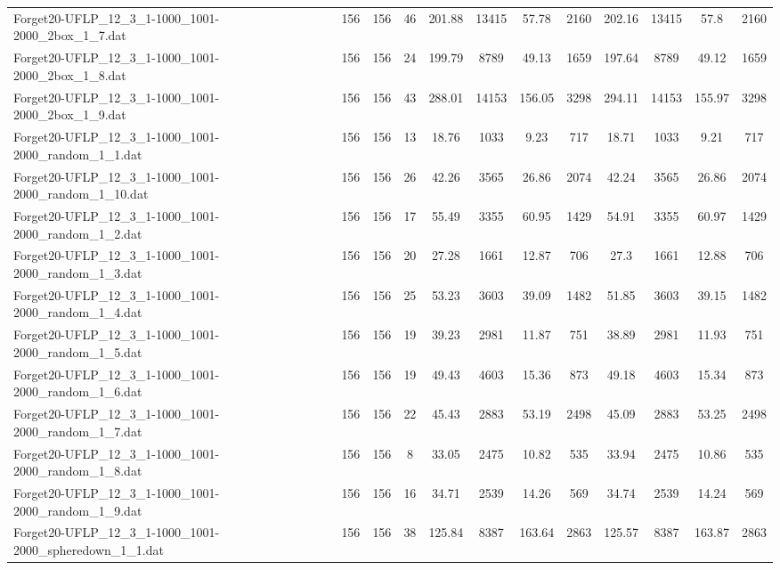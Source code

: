 \begin{sidewaystable}[!ht]
{\begin{tabular}{lccccccccccc}
Forget20-UFLP\_12\_3\_1-1000\_1001-2000\_2box\_1\_7.dat & 156 & 156 & 46 & 201.88 & 13415 &  \textcolor{blue2}{57.78} & 2160 & 202.16 & 13415 & 57.8 & 2160 \\
Forget20-UFLP\_12\_3\_1-1000\_1001-2000\_2box\_1\_8.dat & 156 & 156 & 24 & 199.79 & 8789 & 49.13 & 1659 & 197.64 & 8789 &  \textcolor{blue2}{49.12} & 1659 \\
Forget20-UFLP\_12\_3\_1-1000\_1001-2000\_2box\_1\_9.dat & 156 & 156 & 43 & 288.01 & 14153 & 156.05 & 3298 & 294.11 & 14153 & 155.97 & 3298 \\
Forget20-UFLP\_12\_3\_1-1000\_1001-2000\_random\_1\_1.dat & 156 & 156 & 13 & 18.76 & 1033 & 9.23 & 717 & 18.71 & 1033 & 9.21 & 717 \\
Forget20-UFLP\_12\_3\_1-1000\_1001-2000\_random\_1\_10.dat & 156 & 156 & 26 & 42.26 & 3565 & 26.86 & 2074 & 42.24 & 3565 & 26.86 & 2074 \\
Forget20-UFLP\_12\_3\_1-1000\_1001-2000\_random\_1\_2.dat & 156 & 156 & 17 & 55.49 & 3355 & 60.95 & 1429 &  \textcolor{blue2}{54.91} & 3355 & 60.97 & 1429 \\
Forget20-UFLP\_12\_3\_1-1000\_1001-2000\_random\_1\_3.dat & 156 & 156 & 20 & 27.28 & 1661 &  \textcolor{blue2}{12.87} & 706 & 27.3 & 1661 & 12.88 & 706 \\
Forget20-UFLP\_12\_3\_1-1000\_1001-2000\_random\_1\_4.dat & 156 & 156 & 25 & 53.23 & 3603 & 39.09 & 1482 & 51.85 & 3603 & 39.15 & 1482 \\
Forget20-UFLP\_12\_3\_1-1000\_1001-2000\_random\_1\_5.dat & 156 & 156 & 19 & 39.23 & 2981 &  \textcolor{blue2}{11.87} & 751 & 38.89 & 2981 & 11.93 & 751 \\
Forget20-UFLP\_12\_3\_1-1000\_1001-2000\_random\_1\_6.dat & 156 & 156 & 19 & 49.43 & 4603 & 15.36 & 873 & 49.18 & 4603 & 15.34 & 873 \\
Forget20-UFLP\_12\_3\_1-1000\_1001-2000\_random\_1\_7.dat & 156 & 156 & 22 & 45.43 & 2883 & 53.19 & 2498 & 45.09 & 2883 & 53.25 & 2498 \\
Forget20-UFLP\_12\_3\_1-1000\_1001-2000\_random\_1\_8.dat & 156 & 156 & 8 & 33.05 & 2475 &  \textcolor{blue2}{10.82} & 535 & 33.94 & 2475 & 10.86 & 535 \\
Forget20-UFLP\_12\_3\_1-1000\_1001-2000\_random\_1\_9.dat & 156 & 156 & 16 & 34.71 & 2539 & 14.26 & 569 & 34.74 & 2539 &  \textcolor{blue2}{14.24} & 569 \\
Forget20-UFLP\_12\_3\_1-1000\_1001-2000\_spheredown\_1\_1.dat & 156 & 156 & 38 & 125.84 & 8387 & 163.64 & 2863 & 125.57 & 8387 & 163.87 & 2863 \\

\end{tabular}}
\end{sidewaystable}
